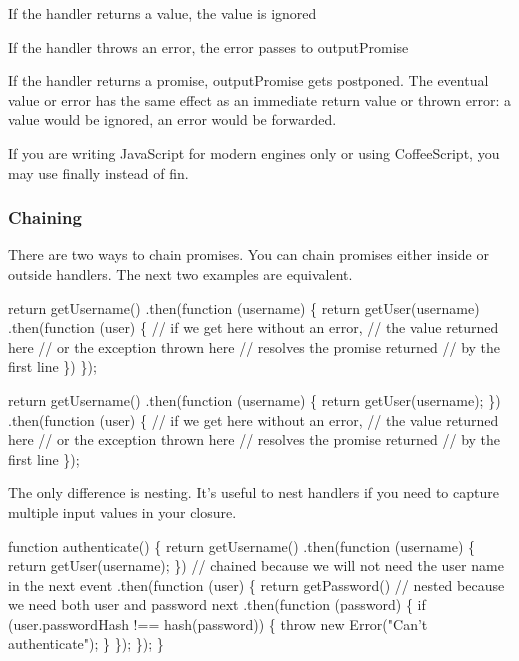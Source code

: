 \begin{DoxyItemize}
\item If the handler returns a value, the value is ignored
\item If the handler throws an error, the error passes to {\ttfamily output\+Promise}
\item If the handler returns a promise, {\ttfamily output\+Promise} gets postponed. The eventual value or error has the same effect as an immediate return value or thrown error\+: a value would be ignored, an error would be forwarded.
\end{DoxyItemize}

If you are writing Java\+Script for modern engines only or using Coffee\+Script, you may use {\ttfamily finally} instead of {\ttfamily fin}.

\subsubsection*{Chaining}

There are two ways to chain promises. You can chain promises either inside or outside handlers. The next two examples are equivalent.


\begin{DoxyCode}
return getUsername()
.then(function (username) \{
    return getUser(username)
    .then(function (user) \{
        // if we get here without an error,
        // the value returned here
        // or the exception thrown here
        // resolves the promise returned
        // by the first line
    \})
\});
\end{DoxyCode}



\begin{DoxyCode}
return getUsername()
.then(function (username) \{
    return getUser(username);
\})
.then(function (user) \{
    // if we get here without an error,
    // the value returned here
    // or the exception thrown here
    // resolves the promise returned
    // by the first line
\});
\end{DoxyCode}


The only difference is nesting. It’s useful to nest handlers if you need to capture multiple input values in your closure.


\begin{DoxyCode}
function authenticate() \{
    return getUsername()
    .then(function (username) \{
        return getUser(username);
    \})
    // chained because we will not need the user name in the next event
    .then(function (user) \{
        return getPassword()
        // nested because we need both user and password next
        .then(function (password) \{
            if (user.passwordHash !== hash(password)) \{
                throw new Error("Can't authenticate");
            \}
        \});
    \});
\}
\end{DoxyCode}


